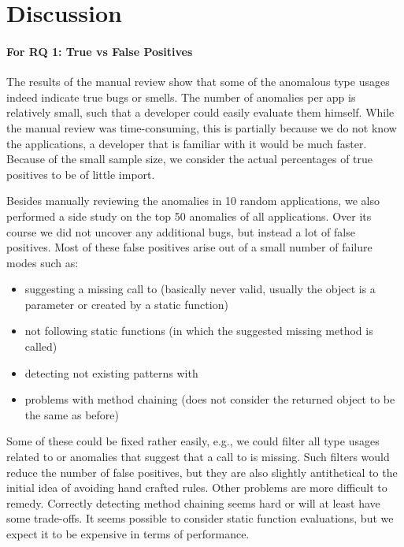 \section{Discussion}

\paragraph{For RQ 1: True vs False Positives}

The results of the manual review show that some of the anomalous type usages indeed indicate true bugs or smells.
The number of anomalies per app is relatively small, such that a developer could easily evaluate them himself.
While the manual review was time-consuming, this is partially because we do not know the applications, a developer that is familiar with it would be much faster.
Because of the small sample size, we consider the actual percentages of true positives to be of little import.

Besides manually reviewing the anomalies in 10 random applications, we also performed a side study on the top 50 anomalies of all applications.
Over its course we did not uncover any additional bugs, but instead a lot of false positives.
Most of these false positives arise out of a small number of failure modes such as:
\begin{itemize}
    \item suggesting a missing call to  (basically never valid, usually the object is a parameter or created by a static function)
    \item not following static functions (in which the suggested missing method is called)
    \item detecting not existing patterns with 
    \item problems with method chaining (does not consider the returned object to be the same as before)
\end{itemize}
Some of these could be fixed rather easily, e.g., we could filter all type usages related to  or anomalies that suggest that a call to  is missing.
Such filters would reduce the number of false positives, but they are also slightly antithetical to the initial idea of avoiding hand crafted rules.
Other problems are more difficult to remedy.
Correctly detecting method chaining seems hard or will at least have some trade-offs.
It seems possible to consider static function evaluations, but we expect it to be expensive in terms of performance.

